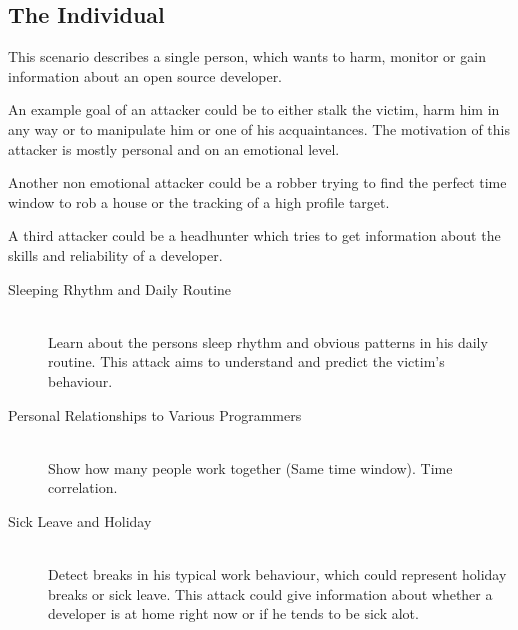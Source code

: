 \subsection{The Individual}
This scenario describes a single person, which wants to harm, monitor or gain information about an open source developer.

An example goal of an attacker could be to either stalk the victim, harm him in any way or to manipulate him or one of his acquaintances.
The motivation of this attacker is mostly personal and on an emotional level.

Another non emotional attacker could be a robber trying to find the perfect time window to rob a house or the tracking of a high profile target.

A third attacker could be a headhunter which tries to get information about the skills and reliability of a developer.

\begin{description}
    \item[Sleeping Rhythm and Daily Routine] \hfill \\
        Learn about the persons sleep rhythm and obvious patterns in his daily routine.
        This attack aims to understand and predict the victim's behaviour.

    \item[Personal Relationships to Various Programmers] \hfill \\
        Show how many people work together (Same time window). Time correlation.

    \item[Sick Leave and Holiday] \hfill \\
        Detect breaks in his typical work behaviour, which could represent holiday breaks or sick leave.
        This attack could give information about whether a developer is at home right now or if he tends to be sick alot.
\end{description}



